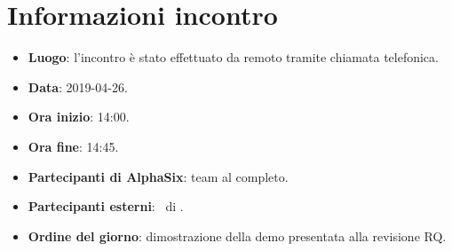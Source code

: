 \newcommand{\documento}{\VE}
\newcommand{\nomedocumentofisico}{VE\_2019-04-26.pdf}
\newcommand{\redazione}{\NC}
\newcommand{\verifica}{\CV}
\newcommand{\approvazione}{\TG}
\newcommand{\versione}{1.0.0}
\newcommand{\uso}{Esterno}
\newcommand{\destinateTo}{\TV, \\ & \RC, \\ & \II}
\newcommand{\datacreazione}{28 aprile 2019}
\newcommand{\datamodifica}{30 aprile 2019}
\newcommand{\stato}{Approvato}

\def\TABELLE{false}	%
\def\FIGURE{false} 	%






    

    

    \section{Informazioni incontro}
    	\begin{itemize}
    		\item \textbf{Luogo}: l'incontro è stato effettuato da remoto tramite chiamata telefonica.
    		\item \textbf{Data}: 2019-04-26.
    		\item \textbf{Ora inizio}: 14:00.
    		\item \textbf{Ora fine}: 14:45.
    		\item \textbf{Partecipanti di AlphaSix}: team al completo.
    		\item \textbf{Partecipanti esterni}: \DZ~di \II.
    		\item \textbf{Ordine del giorno}: dimostrazione della demo presentata alla revisione RQ.

    	\end{itemize}

